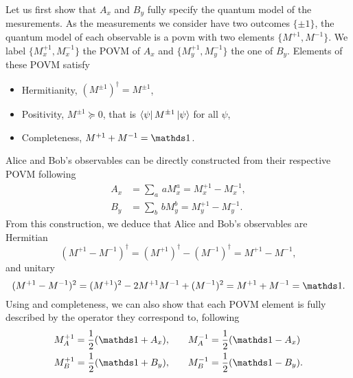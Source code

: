 Let us first show that $A_x$ and $B_y$ fully specify the quantum model of the mesurements.
As the measurements we consider have two outcomes $\{\pm1\}$, the quantum model of each observable is a \acrfull{povm} with two elements $\{M^{+1},M^{-1}\}$. We label $\{M_x^{+1},M_x^{-1}\}$ the POVM of $A_x$ and $\{M_y^{+1},M_y^{-1}\}$ the one of $B_y$.
Elements of these POVM satisfy
\begin{itemize}
	\item Hermitianity, $(M^{\pm1})^\dag=M^{\pm1}$,
	\item Positivity, $M^{\pm1} \succeq 0$, that is $\bra{\psi}M^{\pm1}\ket{\psi}$ for all $\psi$,
	\item Completeness, $M^{+1}+M^{-1}=\id$.
\end{itemize}
Alice and Bob's observables can be directly constructed from their respective POVM following
\begin{equation}
	\begin{split}
		A_x &= \sum_a \,a M^a_x = M^{+1}_x - M^{-1}_x, \\
		B_y &= \sum_b \,b M^b_y = M^{+1}_y - M^{-1}_y.
	\end{split}	
	\label{eq:obs_povm}
\end{equation}
From this construction, we deduce that Alice and Bob's observables are Hermitian
\begin{equation}
	(M^{+1} - M^{-1})^\dag = (M^{+1})^\dag - (M^{-1})^\dag = M^{+1} - M^{-1},
	\label{eq:obs_hermitian}
\end{equation}
and unitary
\begin{equation}
	(M^{+1}- M^{-1})^2 = (M^{+1})^2 - 2 M^{+1} M^{-1} + (M^{-1})^2 = M^{+1} + M^{-1} = \id.
	\label{eq:unitary}
\end{equation}
Using  and completeness, we can also show that each POVM element is fully described by the operator they correspond to, following
\begin{equation}
	\begin{split}
		M^{+1}_A = \frac{1}{2}(\id+A_x),\qquad & M^{-1}_A = \frac{1}{2}(\id-A_x) \\
		M^{+1}_B = \frac{1}{2}(\id+B_y),\qquad & M^{-1}_B = \frac{1}{2}(\id-B_y).
	\end{split}
\end{equation}

\medbreak
	
